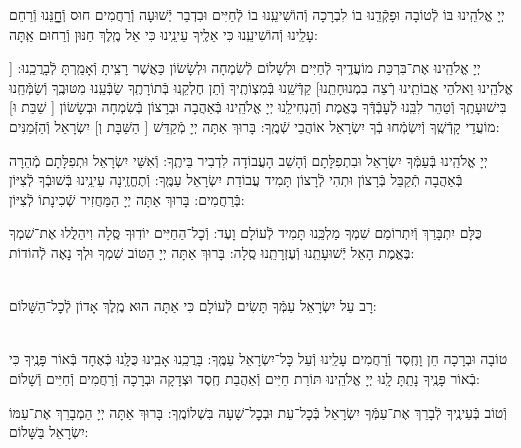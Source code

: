 \documentclass[twoside, openany, parskip=half, 11pt]{book}
\begin{document}
יְיָ אֱלֹהֵֽינוּ בּוֹ לְֿטוֹבָה וּפָקְֿדֵֽנוּ בוֹ לִבְרָכָה וְֿהוֹשִׁיעֵֽנוּ בוֹ לְֿחַיִּים וּבִדְבַר יְֿשׁוּעָה וְֿרַחֲמִים חוּס וְֿחׇׇׇָנֵּנוּ וְֿרַחֵם עָלֵֽינוּ וְֿהוֹשִׁיעֵֽנוּ כִּי אֵלֶֽיךָ עֵינֵֽינוּ כִּי אֵל מֶֽלֶךְ חַנּוּן וְֿרַחוּם אַֽתָּה:

יְיָ אֱלֹהֵֽינוּ אֶת־בִּרְכַּת מוֹעֲדֶֽיךָ לְֿחַיִּים וּלְשָׁלוֹם לְֿשִׂמְחָה וּלְשָׂשׂוֹן כַּאֲשֶׁר רָצִֽיתָ וְֿאָמַֽרְתָּ לְֿבָרֲכֵֽנוּ: [\shabbos%
אֱלֹהֵֽינוּ וֵאלֹהֵי אֲבוֹתֵֽינוּ רְֿצֵה בִמְנוּחָתֵֽנוּ] קַדְּֿשֵֽׁנוּ בְּֿמִצְוֹתֶֽיךָ וְֿתֵן חֶלְקֵֽנוּ בְּֿתוֹרָתֶֽךָ שַׂבְּֿעֵֽנוּ מִטּוּבֶֽךָ וְֿשַׂמְּֿחֵֽנוּ בִּישׁוּעָתֶֽךָ וְֿטַהֵר לִבֵּֽנוּ לְֿעָבְֿדְּֿךָ בֶּאֱמֶת וְֿהַנְחִילֵֽנוּ יְיָ אֱלֹהֵֽינוּ בְּֿאַהֲבָה וּבְרָצוֹן בְּֿשִׂמְחָה וּבְשָׂשׂוֹן
[\shabbos%
שַׁבַּת וּ]
מוֹעֲדֵי קָדְֿשֶֽׁךָ וְֿיִשְׂמְֿחוּ בְֿךָ יִשְׂרָאֵל אוֹהֲבֵי שְֿׁמֶֽךָ: בָּרוּךְ אַתָּה יְיָ מְֿקַדֵּשׁ
[\shabbos%
הַשַּׁבָּת וְ] יִשְׂרָאֵל וְֿהַזְּֿמַנִּים:

יְיָ אֱלֹהֵֽינוּ בְּֿעַמְּֿךָ יִשְׂרָאֵל וּבִתְפִלָּתָם וְֿהָשֵׁב הָעֲבוֹדָה לִדְבִיר בֵּיתֶֽךָ: וְֿאִשֵּׁי יִשְׂרָאֵל וּתְפִלָּתָם מְֿהֵרָה בְּֿאַהֲבָה תְֿקַבֵּל בְּֿרָצוֹן וּתְהִי לְֿרָצוֹן תָּמִיד עֲבוֹדַת יִשְׂרָאֵל עַמֶּֽךָ: וְֿתֶחֱזֶֽינָה עֵינֵֽינוּ בְּֿשׁוּבְֿךָ לְֿצִיּוֹן בְּֿרַחֲמִים: בָּרוּךְ אַתָּה יְיָ הַמַּחֲזִיר שְֿׁכִינָתוֹ לְֿצִיּוֹן:

\modim

כֻּלָּם יִתְבָּרַךְ וְֿיִתְרוֹמַם שִׁמְךָ מַלְכֵּֽנוּ תָּמִיד לְֿעוֹלָם וָעֶד: וְֿכׇל־הַחַיִּים יוֹדֽוּךָ סֶּֽלָה וִיהַלֲלוּ אֶת־שִׁמְךָ בֶּאֱמֶת הָאֵל יְֿשׁוּעָתֵֽנוּ וְֿעֶזְרָתֵֽנוּ סֶֽלָה: בָּרוּךְ אַתָּה יְיָ הַטּוֹב שִׁמְךָ וּלְךָ נָאֶה לְֿהוֹדוֹת:







\begin{paracol}{2}

\\
רָב עַל יִשְׂרָאֵל עַמְּֿךָ תָּשִׂים לְֿעוֹלָם כִּי אַתָּה הוּא מֶֽלֶךְ אָדוֹן לְֿכׇל־הַשָּׁלוֹם:

\switchcolumn


\begin{small}
\\
טוֹבָה וּבְרָכָה חֵן וָחֶֽסֶד וְֿרַחֲמִים עָלֵֽינוּ וְֿעַל כׇּל־יִשְׂרָאֵל עַמֶּֽךָ: בָּרֲכֵֽנוּ אָבִֽינוּ כֻּלָּֽנוּ כְּֿאֶחָד בְּֿאוֹר פָּנֶֽיךָ כִּי בְֿאוֹר פָּנֶֽיךָ נָתַֽתָּ לָֽנוּ יְיָ אֱלֹהֵֽינוּ תּוֹרַת חַיִּים וְֿאַהֲבַת חֶֽסֶד וּצְדָקָה וּבְרָכָה וְֿרַחֲמִים וְֿחַיִּים וְֿשָׁלוֹם:

\end{small}


\end{paracol}
וְֿטוֹב בְּֿעֵינֶֽיךָ לְֿבָרֵךְ אֶת־עַמְּֿךָ יִשְׂרָאֵל בְּֿכׇל־עֵת וּבְכׇל־שָׁעָה בִּשְׁלוֹמֶֽךָ: בָּרוּךְ אַתָּה יְיָ הַמְבָרֵךְ אֶת־עַמּוֹ יִשְׂרָאֵל בַּשָּׁלוֹם:
\end{document}
